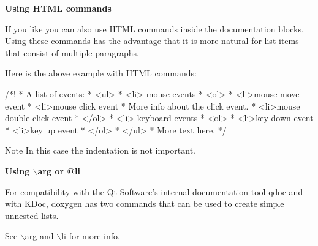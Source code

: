 {\bfseries Using HTML commands}

If you like you can also use HTML commands inside the documentation blocks. Using these commands has the advantage that it is more natural for list items that consist of multiple paragraphs.

Here is the above example with HTML commands: \begin{DoxyVerb}
  /*! 
   *  A list of events:
   *  <ul>
   *  <li> mouse events
   *     <ol>
   *     <li>mouse move event
   *     <li>mouse click event\n
   *         More info about the click event.
   *     <li>mouse double click event
   *     </ol>
   *  <li> keyboard events
   *     <ol>     
   *     <li>key down event
   *     <li>key up event
   *     </ol>
   *  </ul>
   *  More text here.
   */
\end{DoxyVerb}


\begin{DoxyNote}{Note}
In this case the indentation is not important.
\end{DoxyNote}
{\bfseries Using $\backslash$arg or @li}

For compatibility with the Qt Software's internal documentation tool qdoc and with KDoc, doxygen has two commands that can be used to create simple unnested lists.

See \hyperlink{commands_cmdarg}{$\backslash$arg} and \hyperlink{commands_cmdli}{$\backslash$li} for more info.

 